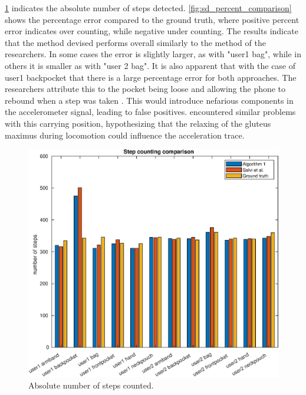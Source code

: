  \cref{fig:sd_abs_comparison} indicates the absolute number of steps detected. \cref{fig:sd_percent_comparison}  shows the percentage error compared to the ground truth, where positive percent error indicates over counting, while negative under counting. The results indicate that the method devised performs overall similarly to the method of the researchers. In some cases the error is slightly larger, as with "user1 bag", while in others it is smaller as with "user 2 bag". It is also apparent that with the case of user1 backpocket that there is a large percentage error for both approaches. The researchers attribute this to the pocket being loose and allowing the phone to rebound when a step was taken \cite{Salvi2018}. This would introduce nefarious components in the accelerometer signal, leading to false positives. \citet{Brajdic2013} encountered similar problems with this carrying position, hypothesizing that the relaxing of the gluteus maximus during locomotion could influence the acceleration trace.
 
	\begin{figure}[htbp]
		\centering
		\includegraphics[width=0.7\linewidth]{images/20201112_1347_step_counting_comparison_1}
		\setlength{\belowcaptionskip}{-20pt}
		\caption{Absolute number of steps counted.}
		\label{fig:sd_abs_comparison}
	\end{figure}
\restoregeometry

